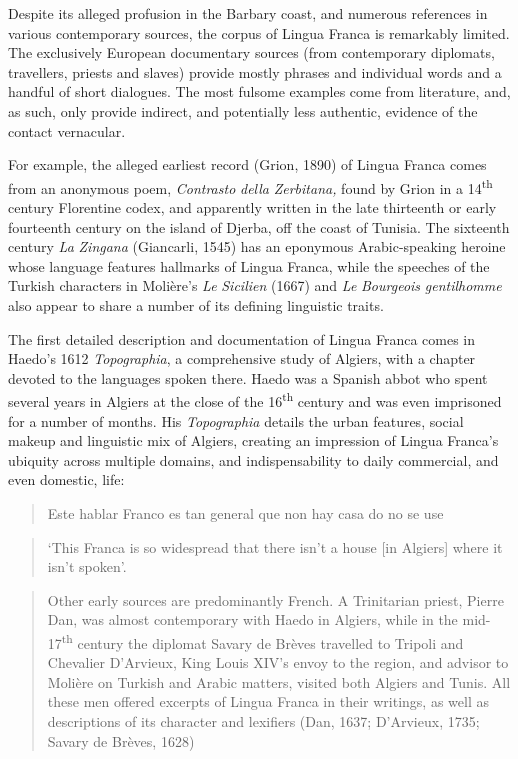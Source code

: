 \documentclass[output=paper]{langsci/langscibook}
\begin{document}
Despite its alleged profusion in the Barbary coast, and numerous references in various contemporary sources, the corpus of Lingua Franca is remarkably limited. The exclusively European documentary sources (from contemporary diplomats, travellers, priests and slaves) provide mostly phrases and individual words and a handful of short dialogues. The most fulsome examples come from literature, and, as such, only provide indirect, and potentially less authentic, evidence of the contact vernacular. 

For example, the alleged earliest record (Grion, 1890) of Lingua Franca comes from an anonymous poem, \textit{Contrasto} \textit{della} \textit{Zerbitana,} found by Grion in a 14\textsuperscript{th} century Florentine codex, and apparently written in the late thirteenth or early fourteenth century on the island of Djerba, off the coast of Tunisia. The sixteenth century \textit{La} \textit{Zingana} (Giancarli, 1545) has an eponymous Arabic-speaking heroine whose language features hallmarks of Lingua Franca, while the speeches of the Turkish characters in Molière’s \textit{Le} \textit{Sicilien} (1667) and \textit{Le} \textit{Bourgeois} \textit{gentilhomme}  also appear to share a number of its defining linguistic traits.

The first detailed description and documentation of Lingua Franca comes in Haedo’s 1612 \textit{Topographia}, a comprehensive study of Algiers, with a chapter devoted to the languages spoken there. Haedo was a Spanish abbot who spent several years in Algiers at the close of the 16\textsuperscript{th} century and was even imprisoned for a number of months. His \textit{Topographia}  details the urban features, social makeup and linguistic mix of Algiers, creating an impression of Lingua Franca’s ubiquity across multiple domains, and indispensability to daily commercial, and even domestic, life: 

\begin{quote}
	Este hablar Franco es tan general que non hay casa do no se use 
\end{quote}

\begin{quote}
	‘This Franca is so widespread that there isn’t a house [in Algiers] where it isn’t spoken’. 
\end{quote}

\begin{quote}
	Other early sources are predominantly French. A Trinitarian priest, Pierre Dan, was almost contemporary with Haedo in Algiers, while in the mid-17\textsuperscript{th} century the diplomat Savary de Brèves travelled to Tripoli and Chevalier D’Arvieux, King Louis XIV’s envoy to the region, and advisor to Molière on Turkish and Arabic matters, visited both Algiers and Tunis. All these men offered excerpts of Lingua Franca in their writings, as well as descriptions of its character and lexifiers (Dan, 1637; D’Arvieux, 1735; Savary de Brèves, 1628)
\end{quote}
\end{document}
